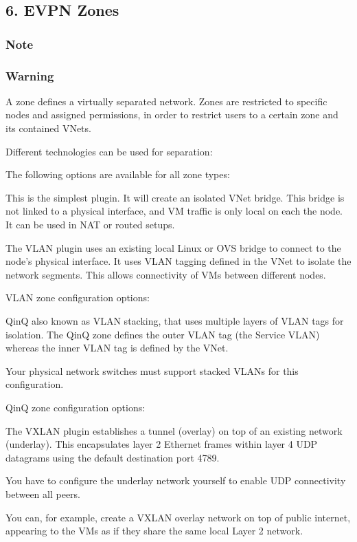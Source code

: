 \subsection{6. EVPN Zones}

\subsubsection{Note}

\subsubsection{Warning}

A zone defines a virtually separated network. Zones are restricted to specific nodes and assigned permissions, in order to restrict users to a certain zone and its contained VNets.

Different technologies can be used for separation:

The following options are available for all zone types:

This is the simplest plugin. It will create an isolated VNet bridge. This bridge is not linked to a physical interface, and VM traffic is only local on each the node. It can be used in NAT or routed setups.

The VLAN plugin uses an existing local Linux or OVS bridge to connect to the node’s physical interface. It uses VLAN tagging defined in the VNet to isolate the network segments. This allows connectivity of VMs between different nodes.

VLAN zone configuration options:

QinQ also known as VLAN stacking, that uses multiple layers of VLAN tags for isolation. The QinQ zone defines the outer VLAN tag (the Service VLAN) whereas the inner VLAN tag is defined by the VNet.

Your physical network switches must support stacked VLANs for this configuration.

QinQ zone configuration options:

The VXLAN plugin establishes a tunnel (overlay) on top of an existing network (underlay). This encapsulates layer 2 Ethernet frames within layer 4 UDP datagrams using the default destination port 4789.

You have to configure the underlay network yourself to enable UDP connectivity between all peers.

You can, for example, create a VXLAN overlay network on top of public internet, appearing to the VMs as if they share the same local Layer 2 network.


